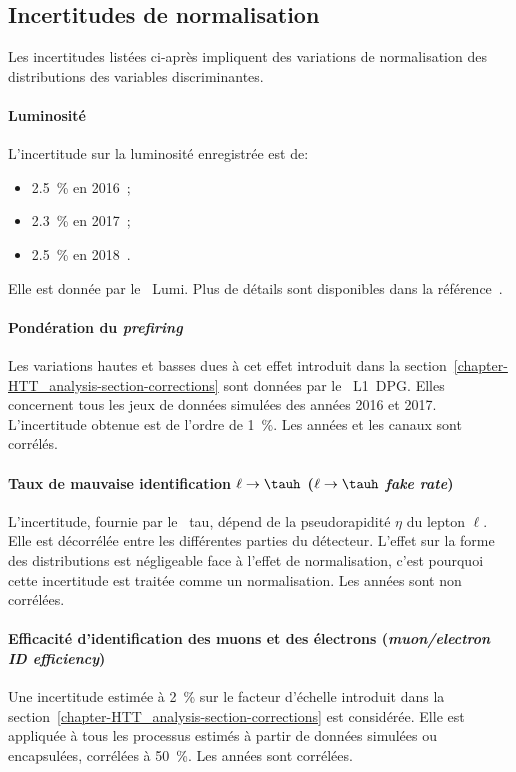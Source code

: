 \subsection{Incertitudes de normalisation}\label{chapter-HTT_analysis-section-systematics-normalization}
Les incertitudes listées ci-après impliquent des variations de normalisation des distributions des variables discriminantes.
\paragraph{Luminosité}
L'incertitude sur la luminosité enregistrée est de:
\begin{itemize}
\item \SI{2.5}{\%} en 2016~\cite{CMS-PAS-LUM-17-001};
\item \SI{2.3}{\%} en 2017~\cite{CMS-PAS-LUM-17-004};
\item \SI{2.5}{\%} en 2018~\cite{CMS-PAS-LUM-18-002}.
\end{itemize}
Elle est donnée par le \POG\ Lumi.
Plus de détails sont disponibles dans la référence~\cite{LumiTwiki}.
\paragraph{Pondération du \emph{prefiring}}
Les variations hautes et basses dues à cet effet introduit dans la section~\ref{chapter-HTT_analysis-section-corrections} sont données par le \POG\ L1~DPG.
Elles concernent tous les jeux de données simulées des années 2016 et 2017.
L'incertitude obtenue est de l'ordre de \SI{1}{\%}.
Les années et les canaux sont corrélés.
\paragraph{Taux de mauvaise identification $\ell\to\tauh$ (\emph{$\ell\to\tauh$ fake rate})}
L'incertitude, fournie par le \POG\ tau, dépend de la pseudorapidité $\eta$ du lepton $\ell$.
Elle est décorrélée entre les différentes parties du détecteur.
L'effet sur la forme des distributions est négligeable face à l'effet de normalisation, c'est pourquoi cette incertitude est traitée comme un normalisation.
Les années sont non corrélées.
\paragraph{Efficacité d'identification des muons et des électrons (\emph{muon/electron ID efficiency})}
Une incertitude estimée à \SI{2}{\%} sur le facteur d'échelle introduit dans la section~\ref{chapter-HTT_analysis-section-corrections} est considérée.
Elle est appliquée à tous les processus estimés à partir de données simulées ou encapsulées, corrélées à \SI{50}{\%}.
Les années sont corrélées.
